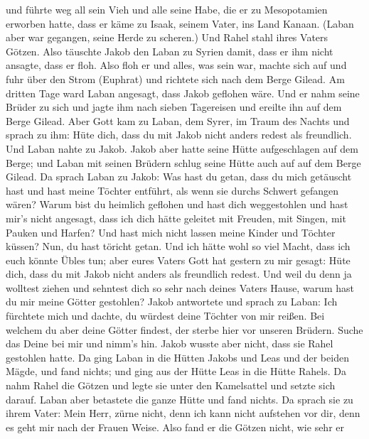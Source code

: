  und führte weg all sein Vieh und alle seine Habe, die er
zu Mesopotamien erworben hatte, dass er käme zu Isaak, seinem Vater, ins
Land Kanaan.  (Laban aber war gegangen, seine Herde zu
scheren.) Und Rahel stahl ihres Vaters Götzen.  Also
täuschte Jakob den Laban zu Syrien damit, dass er ihm nicht ansagte,
dass er floh.  Also floh er und alles, was sein war,
machte sich auf und fuhr über den Strom (Euphrat) und richtete sich nach
dem Berge Gilead.  Am dritten Tage ward Laban angesagt,
dass Jakob geflohen wäre.  Und er nahm seine Brüder zu
sich und jagte ihm nach sieben Tagereisen und ereilte ihn auf dem Berge
Gilead.  Aber Gott kam zu Laban, dem Syrer, im Traum des
Nachts und sprach zu ihm: Hüte dich, dass du mit Jakob nicht anders
redest als freundlich.  Und Laban nahte zu Jakob. Jakob
aber hatte seine Hütte aufgeschlagen auf dem Berge; und Laban mit seinen
Brüdern schlug seine Hütte auch auf auf dem Berge Gilead.
 Da sprach Laban zu Jakob: Was hast du getan, dass du
mich getäuscht hast und hast meine Töchter entführt, als wenn sie durchs
Schwert gefangen wären?  Warum bist du heimlich geflohen
und hast dich weggestohlen und hast mir's nicht angesagt, dass ich dich
hätte geleitet mit Freuden, mit Singen, mit Pauken und Harfen?
 Und hast mich nicht lassen meine Kinder und Töchter
küssen? Nun, du hast töricht getan.  Und ich hätte wohl
so viel Macht, dass ich euch könnte Übles tun; aber eures Vaters Gott
hat gestern zu mir gesagt: Hüte dich, dass du mit Jakob nicht anders als
freundlich redest.  Und weil du denn ja wolltest ziehen
und sehntest dich so sehr nach deines Vaters Hause, warum hast du mir
meine Götter gestohlen?  Jakob antwortete und sprach zu
Laban: Ich fürchtete mich und dachte, du würdest deine Töchter von mir
reißen.  Bei welchem du aber deine Götter findest, der
sterbe hier vor unseren Brüdern. Suche das Deine bei mir und nimm's hin.
Jakob wusste aber nicht, dass sie Rahel gestohlen hatte. 
Da ging Laban in die Hütten Jakobs und Leas und der beiden Mägde, und
fand nichts; und ging aus der Hütte Leas in die Hütte Rahels.
 Da nahm Rahel die Götzen und legte sie unter den
Kamelsattel und setzte sich darauf. Laban aber betastete die ganze Hütte
und fand nichts.  Da sprach sie zu ihrem Vater: Mein
Herr, zürne nicht, denn ich kann nicht aufstehen vor dir, denn es geht
mir nach der Frauen Weise. Also fand er die Götzen nicht, wie sehr er
